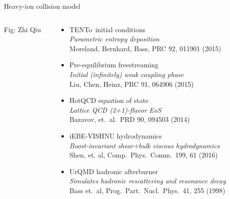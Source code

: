 \documentclass{beamer}
\newcommand{\trento}{T\raisebox{-0.3ex}{R}ENTo}
\begin{document}
\begin{frame}{Heavy-ion collision model}
\begin{columns}[T]
\begin{column}{.2\textwidth}
        \tiny Fig: Zhi Qiu
      \end{column}
      \begin{column}{.7\textwidth}
        \begin{itemize}
          \item \textcolor{theme}{\trento\ initial conditions} \\[.5ex]
            {\scriptsize \emph{Parametric entropy deposition}\\
            Moreland, Bernhard, Bass, PRC 92, 011901 (2015)}
          \item \textcolor{theme}{Pre-equilibrium freestreaming} \\[.5ex]
            {\scriptsize \emph{Initial (infinitely) weak coupling phase} \\
            Liu, Chen, Heinz, PRC 91, 064906 (2015)} 
          \item \textcolor{theme}{HotQCD equation of state} \\[.5ex]
            {\scriptsize \emph{Lattice QCD (2+1)-flavor EoS} \\
            Bazavov, et.\ al.\ PRD 90, 094503 (2014)} \\
          \item \textcolor{theme}{iEBE-VISHNU hydrodynamics} \\[.5ex]
            {\scriptsize \emph{Boost-invariant shear+bulk viscous hydrodynamics}\\
            Shen, et. al, Comp.\ Phys.\ Comm.\ 199, 61 (2016)}  
          \item \textcolor{theme}{UrQMD hadronic afterburner} \\[.5ex]
            {\scriptsize \emph{Simulates hadronic rescattering and resonance decay} \\
            Bass et.\ al, Prog.\ Part.\ Nucl.\ Phys.\ 41, 255 (1998)}
        \end{itemize}
      \end{column}
      \begin{column}{.025\textwidth}
      \end{column}
    \end{columns}

\end{frame}
\end{document}
